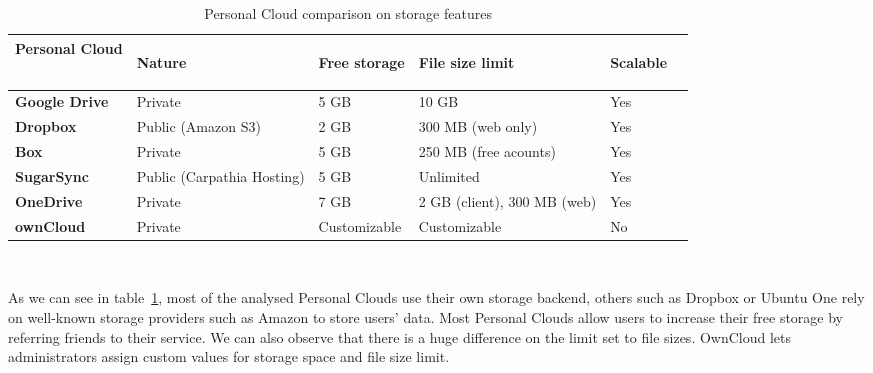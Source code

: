 \begin{table}
\begin{center}
    \begin{tabular}{ | p{3.4cm} | p{2.0cm} | p{2.6cm} | p{2.6cm} | p{1.0cm} | p{1.0cm} | }
    \hline
    \rowcolor[gray]{0.8}

	\textbf{Personal Cloud} &
	\begin{sideways}\textbf{Nature}\end{sideways} &
	\begin{sideways}\textbf{Free storage}\end{sideways} &
	\begin{sideways}\textbf{File size limit}\end{sideways} & 
	\begin{sideways}\textbf{Scalable}\end{sideways} \\ \hline

	\textbf{Google Drive} &
	Private &
	5 GB &
	10 GB &
	Yes \\ \hline

	\textbf{Dropbox} &
	Public (Amazon S3) &
	2 GB &
	300 MB (web only) &
	Yes \\ \hline
	
	
	\textbf{Box} &
	Private &
	5 GB & 
	250 MB (free acounts) &
	Yes \\ \hline
	
	\textbf{SugarSync} & 
	Public (Carpathia Hosting) &
	5 GB &
	Unlimited &
	Yes \\ \hline
	
	\textbf{OneDrive} & 
	Private &
	7 GB &
	2 GB (client), 300 MB (web) &
	Yes \\ \hline
	
	\textbf{ownCloud} &
	Private &
	Customizable &
	Customizable &
	No \\ \hline

    \end{tabular}
    \\[10pt]
    \caption{Personal Cloud comparison on storage features}
    \label{tab:pc_storage}
\end{center}
\end{table}

As we can see in table~\ref{tab:pc_storage}, most of the analysed Personal Clouds use their own storage backend, others such as Dropbox or Ubuntu One rely on well-known storage providers such as Amazon to store users' data. Most Personal Clouds allow users to increase their free storage by referring friends to their service. We can also observe that there is a huge difference on the limit set to file sizes. OwnCloud lets administrators assign custom values for storage space and file size limit.

